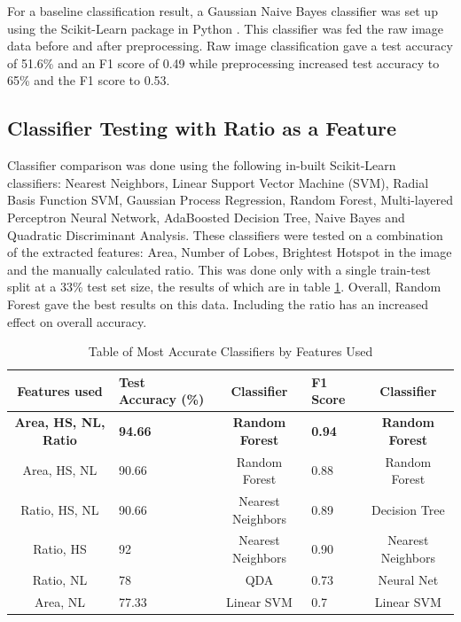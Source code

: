 \documentclass[conference]{IEEEtran}
\begin{document}
For a baseline classification result, a Gaussian Naive Bayes classifier was set up using the Scikit-Learn package in Python \cite{scikit-learn}. This classifier was fed the raw image data before and after preprocessing. Raw image classification gave a test accuracy of 51.6\% and an F1 score of 0.49 while preprocessing increased test accuracy to 65\% and the F1 score to 0.53. 

\subsection{Classifier Testing with Ratio as a Feature}

Classifier comparison was done using the following in-built Scikit-Learn classifiers: Nearest Neighbors, Linear Support Vector Machine (SVM), Radial Basis Function SVM, Gaussian Process Regression, Random Forest, Multi-layered Perceptron Neural Network, AdaBoosted Decision Tree, Naive Bayes and Quadratic Discriminant Analysis. These classifiers were tested on a combination of the extracted features: Area, Number of Lobes, Brightest Hotspot in the image and the manually calculated ratio. This was done only with a single train-test split at a 33\% test set size, the results of which are in table \ref{tab:freq}. Overall, Random Forest gave the best results on this data. Including the ratio has an increased effect on overall accuracy.

\begin{table}[h]
  \caption{Table of Most Accurate Classifiers by Features Used}
  \label{tab:freq}
\begin{center}
\begin{tabular}{|c|l|c|l|c|}
    \hline
        Features used & Test Accuracy (\%) & Classifier & F1 Score & Classifier \\
        \hline
        \textbf{Area, HS, NL, Ratio} & \textbf{94.66} & \textbf{Random Forest} & \textbf{0.94} & \textbf{Random Forest}\\
        \hline
        Area, HS, NL & 90.66 & Random Forest & 0.88 & Random Forest \\
        \hline
        Ratio, HS, NL & 90.66 & Nearest Neighbors & 0.89 & Decision Tree \\
        \hline
        Ratio, HS & 92 & Nearest Neighbors & 0.90 & Nearest Neighbors \\
        \hline
        Ratio, NL & 78 & QDA & 0.73 & Neural Net  \\
        \hline
        Area, NL & 77.33 & Linear SVM & 0.7 & Linear SVM \\
    \hline
\end{tabular}
\end{center}
\end{table}
\end{document}
